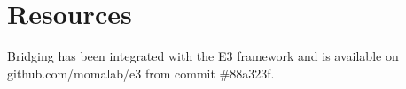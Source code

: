 \section*{Resources}

Bridging has been integrated with the E3 framework and is available on github.com/momalab/e3 from commit \#88a323f.